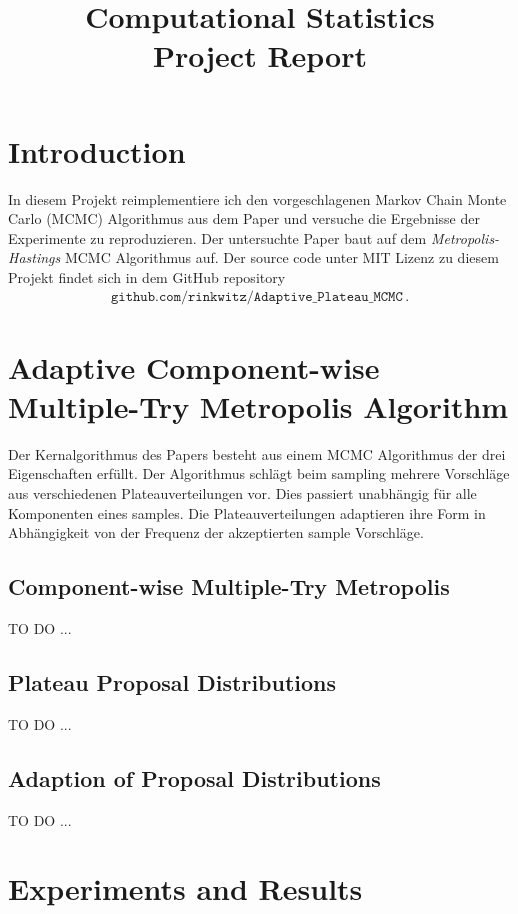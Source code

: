 \documentclass{scrartcl}
\title{Computational Statistics\\Project Report}
\begin{document}
\maketitle

\section{Introduction}
In diesem Projekt reimplementiere ich den vorgeschlagenen Markov Chain Monte Carlo (MCMC) Algorithmus aus dem Paper
\cite{lau2019} und versuche die Ergebnisse der Experimente zu reproduzieren. Der untersuchte Paper baut auf dem
\textit{Metropolis-Hastings} MCMC Algorithmus \cite{metropolis1953} auf. \cite{liu2000}
Der source code unter MIT Lizenz zu diesem Projekt findet sich in dem GitHub repository
\begin{align*}
	\texttt{github.com/rinkwitz/Adaptive\_Plateau\_MCMC}\,.
\end{align*}  

\section{Adaptive Component-wise Multiple-Try Metropolis Algorithm} Der Kernalgorithmus des Papers \cite{lau2019}
besteht aus einem MCMC Algorithmus der drei Eigenschaften erfüllt. Der Algorithmus schlägt beim sampling mehrere
Vorschläge aus verschiedenen Plateauverteilungen vor. Dies passiert unabhängig für alle Komponenten eines samples.
Die Plateauverteilungen adaptieren ihre Form in Abhängigkeit von der Frequenz der akzeptierten sample Vorschläge.

\subsection{Component-wise Multiple-Try Metropolis}
TO DO ...

\subsection{Plateau Proposal Distributions}
TO DO ...

\subsection{Adaption of Proposal Distributions}
TO DO ...

\section{Experiments and Results}
\end{document}
